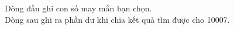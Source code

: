 Dòng đầu ghi con số may mắn bạn chọn.   
\\   Dòng sau ghi ra phần dư khi chia kết quả tìm được cho 10007.